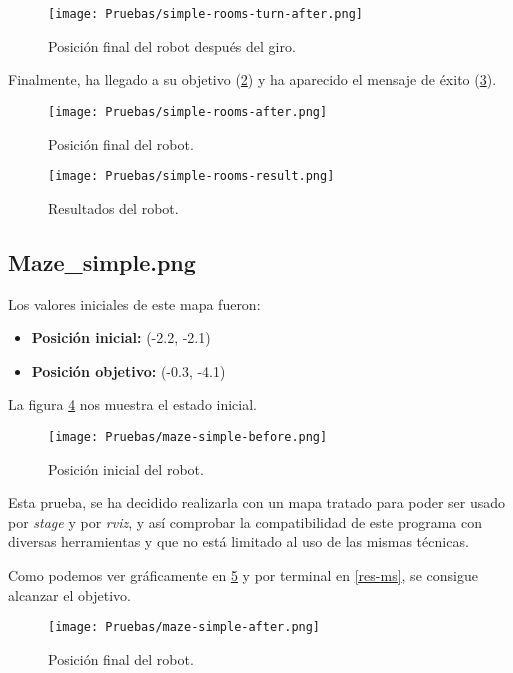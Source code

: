 \documentclass[a4paper, 11pt]{article}
\begin{document}
		\begin{figure}[H]
			\centering
			\texttt{[image: Pruebas/simple-rooms-turn-after.png]}
			\caption{Posición final del robot después del giro.}
			\label{turn-a-sr}	
		\end{figure}
		
		Finalmente, ha llegado a su objetivo (\ref{end-sr}) y ha aparecido el mensaje de éxito (\ref{res-sr}).

		\begin{figure}[H]
			\centering
			\texttt{[image: Pruebas/simple-rooms-after.png]}
			\caption{Posición final del robot.}
			\label{end-sr}	
		\end{figure}

		\begin{figure}[H]
			\centering
			\texttt{[image: Pruebas/simple-rooms-result.png]}
			\caption{Resultados del robot.}
			\label{res-sr}	
		\end{figure}
	

	\subsection{Maze\_simple.png}
		Los valores iniciales de este mapa fueron:
		
		\begin{itemize}
			\item \textbf{Posición inicial:} (-2.2, -2.1)
			\item \textbf{Posición objetivo:} (-0.3, -4.1)
		\end{itemize}
		
		La figura \ref{begin-ms} nos muestra el estado inicial.
		
		\begin{figure}[H]
			\centering
			\texttt{[image: Pruebas/maze-simple-before.png]}
			\caption{Posición inicial del robot.}
			\label{begin-ms}	
		\end{figure}
		
		Esta prueba, se ha decidido realizarla con un mapa tratado para poder ser usado por \textit{stage}
		y por \textit{rviz}, y así comprobar la compatibilidad de este programa con diversas herramientas
		y que no está limitado al uso de las mismas técnicas.

		Como podemos ver gráficamente en \ref{end-ms} y por terminal en \ref{res-ms}, se consigue alcanzar
		el objetivo.

		\begin{figure}[H]
			\centering
			\texttt{[image: Pruebas/maze-simple-after.png]}
			\caption{Posición final del robot.}
			\label{end-ms}	
		\end{figure}
		
\end{document}
